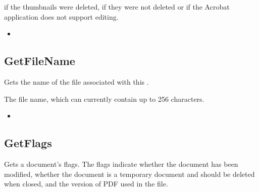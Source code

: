 \documentclass[letterpaper,12pt,english,openany,oneside]{sphinxmanual}
\begin{document}

 if the thumbnails were deleted,  if they were not deleted or if the Acrobat application does not support editing.

\label{\detokenize{IAC_API_OLE_Objects:related-methods-95}}
\begin{itemize}
\item {} 
 

\end{itemize}




\subsection{GetFileName}
\label{\detokenize{IAC_API_OLE_Objects:getfilename}}
Gets the name of the file associated with this .


\begin{sphinxVerbatim}[commandchars=\\\{\}]
 
\end{sphinxVerbatim}


The file name, which can currently contain up to 256 characters.

\label{\detokenize{IAC_API_OLE_Objects:related-methods-96}}
\begin{itemize}
\item {} 
 

\end{itemize}




\subsection{GetFlags}
\label{\detokenize{IAC_API_OLE_Objects:getflags}}
Gets a document’s flags. The flags indicate whether the document has been modified, whether the document is a temporary document and should be deleted when closed, and the version of PDF used in the file.
\end{document}
